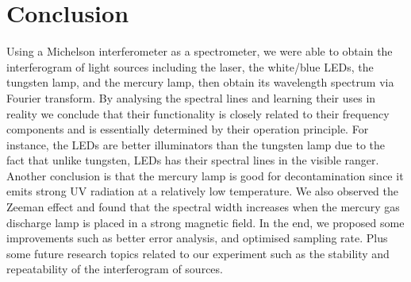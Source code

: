 \documentclass[journal]{Imperial_lab_report}
\begin{document}
\section{Conclusion}
\label{Conclusion}
Using a Michelson interferometer as a spectrometer, we were able to obtain the interferogram of light sources including the laser, the white/blue LEDs, the tungsten lamp, and the mercury lamp, then obtain its wavelength spectrum via Fourier transform. By analysing the spectral lines and learning their uses in reality we conclude that their functionality is closely related to their frequency components and is essentially determined by their operation principle. For instance, the LEDs are better illuminators than the tungsten lamp due to the fact that unlike tungsten, LEDs has their spectral lines in the visible ranger. Another conclusion is that the mercury lamp is good for decontamination since it emits strong UV radiation at a relatively low temperature. We also observed the Zeeman effect and found that the spectral width increases when the mercury gas discharge lamp is placed in a strong magnetic field. In the end, we proposed some improvements such as better error analysis, and optimised sampling rate. Plus some future research topics related to our experiment such as the stability and repeatability of the interferogram of sources.\\\\




\end{document}
